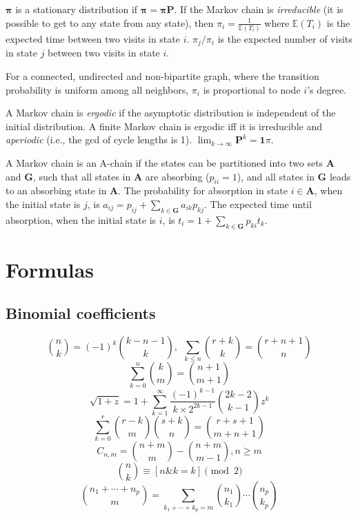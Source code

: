 $\mathbf{\pi}$ is a stationary distribution if $\mathbf{\pi} = \mathbf{\pi P}$.
If the Markov chain is \emph{irreducible} (it is possible to get to any state from any state),
then $\pi_i = \frac{1}{\mathbb{E}(T_i)}$ where $\mathbb{E}(T_i)$  is the expected time between two visits in state $i$.
$\pi_j/\pi_i$ is the expected number of visits in state $j$ between two visits in state $i$.

For a connected, undirected and non-bipartite graph, where the transition probability is uniform among all neighbors, $\pi_i$ is proportional to node $i$'s degree.

A Markov chain is \emph{ergodic} if the asymptotic distribution is independent of the initial distribution.
A finite Markov chain is ergodic iff it is irreducible and \emph{aperiodic} (i.e., the gcd of cycle lengths is 1).
$\lim_{k\rightarrow\infty}\mathbf{P}^k = \mathbf{1}\pi$.

A Markov chain is an A-chain if the states can be partitioned into two sets $\mathbf{A}$ and $\mathbf{G}$, such that all states in $\mathbf{A}$ are absorbing ($p_{ii}=1$), and all states in $\mathbf{G}$ leads to an absorbing state in $\mathbf{A}$.
The probability for absorption in state $i\in\mathbf{A}$, when the initial state is $j$, is $a_{ij} = p_{ij}+\sum_{k\in\mathbf{G}} a_{ik}p_{kj}$.
The expected time until absorption, when the initial state is $i$, is $t_i = 1+\sum_{k\in\mathbf{G}}p_{ki}t_k$.

\section{Formulas}
	\subsection{Binomial coefficients}
	\[ {n \choose k} = (-1)^k{k-n-1 \choose k},\ \ \sum_{k \leq n}{r+k \choose k} = {r+n+1 \choose n} \]
	\[ \sum_{k=0}^n{k \choose m} = {n+1 \choose m+1} \]
	\[ \sqrt{1+z} = 1 + \sum_{k=1}^{\infty}\frac{(-1)^{k-1}}{k\times2^{2k-1}}{2k-2 \choose k-1}z^k \]
	\[ \sum_{k=0}^{r}{r-k \choose m}{s+k \choose n} = {r+s+1 \choose m+n+1} \]
	\[ C_{n, m} = {n+m \choose m} - {n+m \choose m-1}, n \geq m \]
	\[ {n \choose k} \equiv [n\& k=k] \pmod 2 \]
	\[ {{n_1+\cdots+n_p}\choose m}=\sum_{k_1+\cdots+k_p=m}{n_1\choose k_1}\cdots{n_p\choose k_p}\]
